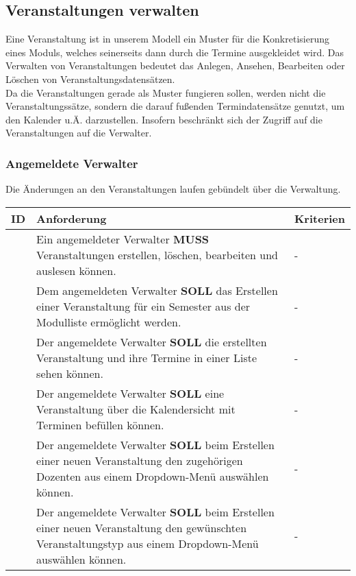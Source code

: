 \newpage

\subsection{Veranstaltungen verwalten}
Eine Veranstaltung ist in unserem Modell ein Muster für die Konkretisierung eines Moduls, welches seinerseits dann durch die Termine ausgekleidet wird. Das Verwalten von Veranstaltungen 
bedeutet das Anlegen, Ansehen, Bearbeiten oder Löschen von Veranstaltungsdatensätzen.\\
Da die Veranstaltungen gerade als Muster fungieren sollen,  werden nicht die Veranstaltungssätze, sondern die darauf fußenden Termindatensätze genutzt, um den Kalender u.Ä. darzustellen. Insofern beschränkt sich der Zugriff auf die Veranstaltungen auf die Verwalter.


\subsubsection{Angemeldete Verwalter }
Die Änderungen an den Veranstaltungen laufen gebündelt über die Verwaltung.
\begin{tabular} {|p{}|p{}|p{}|}
	\hline
	ID & Anforderung & Kriterien \\
	\hline
	\printfreqnr
	& Ein angemeldeter Verwalter \textbf{MUSS} Veranstaltungen erstellen, löschen, bearbeiten und auslesen können.
	& - \\
	\hline
	\printfreqnr
	& Dem angemeldeten Verwalter \textbf{SOLL} das Erstellen einer Veranstaltung für ein Semester aus der Modulliste ermöglicht werden.
	& - \\
	\hline
	\printfreqnr
	& Der angemeldete Verwalter \textbf{SOLL} die erstellten Veranstaltung und ihre Termine in einer Liste sehen können. 
	& - \\
	\hline
	\printfreqnr
	& Der angemeldete Verwalter \textbf{SOLL} eine Veranstaltung über die Kalendersicht mit Terminen befüllen können.
	& - \\
	\hline
	\printfreqnr
	& Der angemeldete Verwalter \textbf{SOLL} beim Erstellen einer neuen Veranstaltung den zugehörigen Dozenten aus einem Dropdown-Menü auswählen können.
	& - \\
	\hline
		\printfreqnr
	& Der angemeldete Verwalter \textbf{SOLL} beim Erstellen einer neuen Veranstaltung den gewünschten Veranstaltungstyp aus einem Dropdown-Menü auswählen können.
	& - \\
	\hline
\end{tabular}

